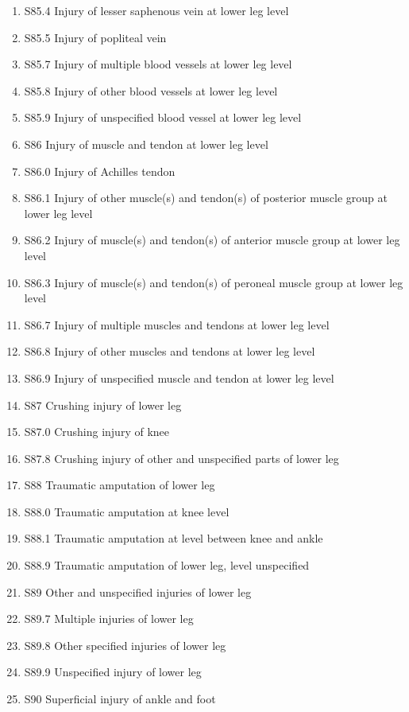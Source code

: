 \documentclass[
]{scrartcl}
\begin{document}
\begin{itemize}
\begin{enumerate}
  \item
    S85.4 Injury of lesser saphenous vein at lower leg level
  \item
    S85.5 Injury of popliteal vein
  \item
    S85.7 Injury of multiple blood vessels at lower leg level
  \item
    S85.8 Injury of other blood vessels at lower leg level
  \item
    S85.9 Injury of unspecified blood vessel at lower leg level
  \item
    S86 Injury of muscle and tendon at lower leg level
  \item
    S86.0 Injury of Achilles tendon
  \item
    S86.1 Injury of other muscle(s) and tendon(s) of posterior muscle
    group at lower leg level
  \item
    S86.2 Injury of muscle(s) and tendon(s) of anterior muscle group at
    lower leg level
  \item
    S86.3 Injury of muscle(s) and tendon(s) of peroneal muscle group at
    lower leg level
  \item
    S86.7 Injury of multiple muscles and tendons at lower leg level
  \item
    S86.8 Injury of other muscles and tendons at lower leg level
  \item
    S86.9 Injury of unspecified muscle and tendon at lower leg level
  \item
    S87 Crushing injury of lower leg
  \item
    S87.0 Crushing injury of knee
  \item
    S87.8 Crushing injury of other and unspecified parts of lower leg
  \item
    S88 Traumatic amputation of lower leg
  \item
    S88.0 Traumatic amputation at knee level
  \item
    S88.1 Traumatic amputation at level between knee and ankle
  \item
    S88.9 Traumatic amputation of lower leg, level unspecified
  \item
    S89 Other and unspecified injuries of lower leg
  \item
    S89.7 Multiple injuries of lower leg
  \item
    S89.8 Other specified injuries of lower leg
  \item
    S89.9 Unspecified injury of lower leg
  \item
    S90 Superficial injury of ankle and foot

\end{enumerate}
\end{itemize}
\end{document}
